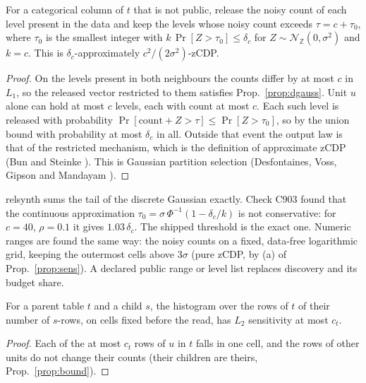 \setcounter{proposition}{902}
\begin{proposition}\label{prop:levels}
For a categorical column of $t$ that is not public, release the noisy count of each level present in the data and keep the levels whose noisy count exceeds $\tau=c+\tau_0$, where $\tau_0$ is the smallest integer with $k\,\Pr[Z>\tau_0]\le\delta_c$ for $Z\sim\mathcal{N}_\mathbb{Z}(0,\sigma^2)$ and $k=c$. This is $\delta_c$-approximately $c^2/(2\sigma^2)$-zCDP.
\end{proposition}
\begin{proof}
On the levels present in both neighbours the counts differ by at most $c$ in $L_1$, so the released vector restricted to them satisfies Prop.~\ref{prop:dgauss}. Unit $u$ alone can hold at most $c$ levels, each with count at most $c$. Each such level is released with probability $\Pr[\text{count}+Z>\tau]\le\Pr[Z>\tau_0]$, so by the union bound with probability at most $\delta_c$ in all. Outside that event the output law is that of the restricted mechanism, which is the definition of approximate zCDP (Bun and Steinke \cite{bun2016}). This is Gaussian partition selection (Desfontaines, Voss, Gipson and Mandayam \cite{desfontaines2022}).
\end{proof}
\noindent relsynth sums the tail of the discrete Gaussian exactly. Check C903 found that the continuous approximation $\tau_0=\sigma\,\Phi^{-1}(1-\delta_c/k)$ is not conservative: for $c=40$, $\rho=0.1$ it gives $1.03\,\delta_c$. The shipped threshold is the exact one. Numeric ranges are found the same way: the noisy counts on a fixed, data-free logarithmic grid, keeping the outermost cells above $3\sigma$ (pure zCDP, by (a) of Prop.~\ref{prop:sens}). A declared public range or level list replaces discovery and its budget share.

\setcounter{proposition}{903}
\begin{proposition}\label{prop:degree}
For a parent table $t$ and a child $s$, the histogram over the rows of $t$ of their number of $s$-rows, on cells fixed before the read, has $L_2$ sensitivity at most $c_t$.
\end{proposition}
\begin{proof}
Each of the at most $c_t$ rows of $u$ in $t$ falls in one cell, and the rows of other units do not change their counts (their children are theirs, Prop.~\ref{prop:bound}).
\end{proof}

